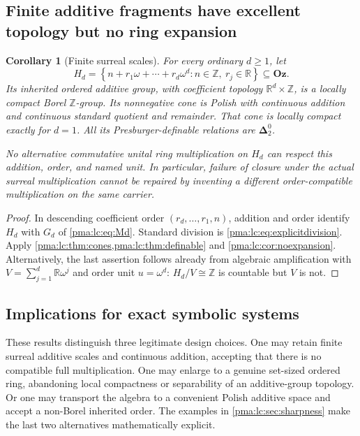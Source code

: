 \documentclass[11pt]{article}
\numberwithin{equation}{section}
\newtheorem{corollary}[corollary]{Corollary}
\theoremstyle{definition}
\theoremstyle{remark}
\newcommand{\Z}{\mathbb Z}
\newcommand{\R}{\mathbb R}
\newcommand{\Oz}{\mathbf{Oz}}
\newcommand{\Dtwo}{\boldsymbol{\Delta}^{0}_{2}}
\begin{document}
\subsection{Finite additive fragments have excellent topology but no ring expansion}
\begin{corollary}[Finite surreal scales]\label{pma:lc:cor:finitescales}
For every ordinary $d\ge1$, let
\begin{equation}\label{pma:lc:eq:surrealGd}
 H_d=\left\{n+r_1\omega+\cdots+r_d\omega^d:
            n\in\Z,\ r_j\in\R\right\}\subseteq\Oz.
\end{equation}
Its inherited ordered additive group, with coefficient topology
$\R^d\times\Z$, is a locally compact Borel $\Z$-group. Its nonnegative
cone is Polish with continuous addition and continuous standard quotient
and remainder. That cone is locally compact exactly for $d=1$.
All its Presburger-definable relations are $\Dtwo$.

No alternative commutative unital ring multiplication on $H_d$ can
respect this addition, order, and named unit. In particular, failure
of closure under the actual surreal multiplication cannot be repaired
by inventing a different order-compatible multiplication on the same
carrier.
\end{corollary}
\begin{proof}
In descending coefficient order $(r_d,\ldots,r_1,n)$, addition and
order identify $H_d$ with $G_d$ of \eqref{pma:lc:eq:Md}. Standard division
is \eqref{pma:lc:eq:explicitdivision}. Apply \cref{pma:lc:thm:cones,pma:lc:thm:definable}
and \cref{pma:lc:cor:noexpansion}. Alternatively, the last assertion follows
already from algebraic amplification with
$V=\sum_{j=1}^d\R\omega^j$ and order unit $u=\omega^d$:
$H_d/V\cong\Z$ is countable but $V$ is not.
\end{proof}

\subsection{Implications for exact symbolic systems}
These results distinguish three legitimate design choices. One may retain
finite surreal additive scales and continuous addition, accepting that
there is no compatible full multiplication. One may enlarge to a genuine
set-sized ordered ring, abandoning local compactness or separability of
an additive-group topology. Or one may transport the algebra to a
convenient Polish additive space and accept a non-Borel inherited order.
The examples in \cref{pma:lc:sec:sharpness} make the last two alternatives
mathematically explicit.
\end{document}
